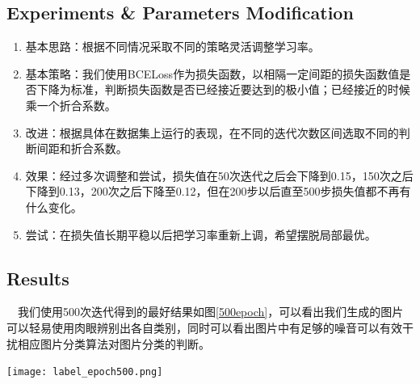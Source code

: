 \documentclass[portrait]{a0poster}
\begin{document}
\begin{multicols}{2}
\begin{CJK}{UTF8}{gbsn}
\subsection*{Experiments \& Parameters Modification}
\begin{enumerate}
	\item 基本思路：根据不同情况采取不同的策略灵活调整学习率。
	\item 基本策略：我们使用BCELoss作为损失函数，以相隔一定间距的损失函数值是否下降为标准，判断损失函数是否已经接近要达到的极小值；已经接近的时候乘一个折合系数。
	\item 改进：根据具体在数据集上运行的表现，在不同的迭代次数区间选取不同的判断间距和折合系数。
	\item 效果：经过多次调整和尝试，损失值在50次迭代之后会下降到0.15，150次之后下降到0.13，200次之后下降至0.12，但在200步以后直至500步损失值都不再有什么变化。
	\item 尝试：在损失值长期平稳以后把学习率重新上调，希望摆脱局部最优。
\end{enumerate}


\end{CJK}
\begin{CJK}{UTF8}{gbsn}
\section*{Results}
\ \ 我们使用500次迭代得到的最好结果如图\ref{500epoch}，可以看出我们生成的图片可以轻易使用肉眼辨别出各自类别，同时可以看出图片中有足够的噪音可以有效干扰相应图片分类算法对图片分类的判断。

\begin{center}\vspace{1cm}
\texttt{[image: label\_epoch500.png]}
\label{500epoch}
\end{center}\vspace{1cm}


\end{CJK}
\end{multicols}
\end{document}
